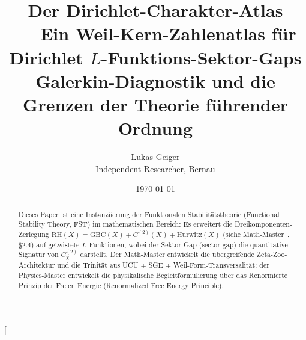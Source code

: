 \documentclass[10pt,twocolumn]{article}
\title{Der Dirichlet-Charakter-Atlas\\
  \large --- Ein Weil-Kern-Zahlenatlas für Dirichlet $L$-Funktions-Sektor-Gaps\\
  \normalsize Galerkin-Diagnostik und die Grenzen der Theorie führender Ordnung}
\author{Lukas Geiger\\\small Independent Researcher, Bernau}
\date{\today}
\theoremstyle{definition}
\theoremstyle{remark}
\newcommand{\chifn}{\chi}
\begin{document}
\twocolumn[
\maketitle
\begin{abstract}
\noindent
Dieses Paper ist eine Instanziierung der Funktionalen Stabilitätstheorie
(Functional Stability Theory, FST) im mathematischen Bereich: Es erweitert die
Dreikomponenten-Zerlegung $\mathrm{RH}(X) = \mathrm{GBC}(X) + C^{(2)}(X) + \mathrm{Hurwitz}(X)$
(siehe Math-Master~\cite{MathMaster}, \S2.4) auf
getwistete $L$-Funktionen, wobei der Sektor-Gap (sector gap) die quantitative
Signatur von $C^{(2)}_{\chifn}$ darstellt. Der Math-Master
\cite{MathMaster} entwickelt die übergreifende Zeta-Zoo-Architektur und
die Trinität aus UCU + SGE + Weil-Form-Transversalität; der Physics-Master
\cite{RFEPFramework} entwickelt die physikalische Begleitformulierung
über das Renormierte Prinzip der Freien Energie (Renormalized Free Energy Principle).


\end{abstract}
\end{document}
